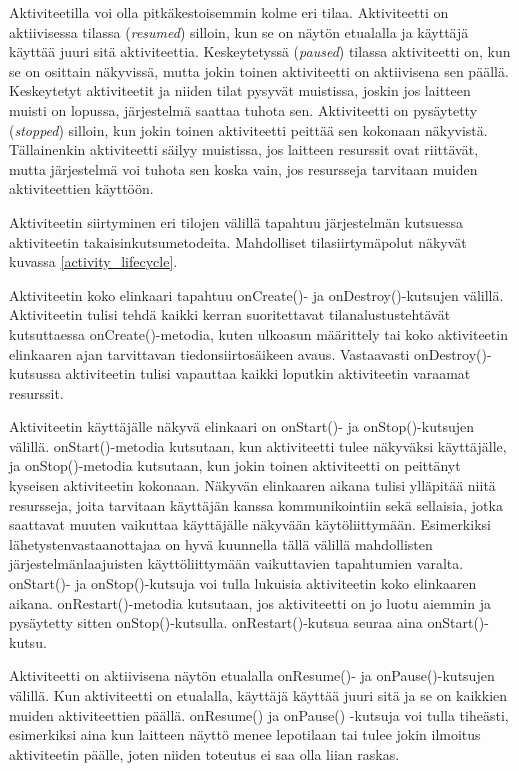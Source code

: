Aktiviteetilla voi olla pitkäkestoisemmin kolme eri tilaa. Aktiviteetti on aktiivisessa tilassa (\emph{resumed}) silloin, kun se on näytön etualalla ja käyttäjä käyttää juuri sitä aktiviteettia. Keskeytetyssä (\emph{paused}) tilassa aktiviteetti on, kun se on osittain näkyvissä, mutta jokin toinen aktiviteetti on aktiivisena sen päällä. Keskeytetyt aktiviteetit ja niiden tilat pysyvät muistissa, joskin jos laitteen muisti on lopussa, järjestelmä saattaa tuhota sen. Aktiviteetti on pysäytetty (\emph{stopped}) silloin, kun jokin toinen aktiviteetti peittää sen kokonaan näkyvistä. Tällainenkin aktiviteetti säilyy muistissa, jos laitteen resurssit ovat riittävät, mutta järjestelmä voi tuhota sen koska vain, jos resursseja tarvitaan muiden aktiviteettien käyttöön.

Aktiviteetin siirtyminen eri tilojen välillä tapahtuu järjestelmän kutsuessa aktiviteetin takaisinkutsumetodeita. Mahdolliset tilasiirtymäpolut näkyvät kuvassa \ref{activity_lifecycle}. 

Aktiviteetin koko elinkaari tapahtuu onCreate()- ja onDestroy()-kutsujen välillä. Aktiviteetin tulisi tehdä kaikki kerran suoritettavat tilanalustustehtävät kutsuttaessa onCreate()-metodia, kuten ulkoasun määrittely tai koko aktiviteetin elinkaaren ajan tarvittavan tiedonsiirtosäikeen avaus. Vastaavasti onDestroy()-kutsussa aktiviteetin tulisi vapauttaa kaikki loputkin aktiviteetin varaamat resurssit.

Aktiviteetin käyttäjälle näkyvä elinkaari on onStart()- ja onStop()-kutsujen välillä. onStart()-metodia kutsutaan, kun aktiviteetti tulee näkyväksi käyttäjälle, ja onStop()-metodia kutsutaan, kun jokin toinen aktiviteetti on peittänyt kyseisen aktiviteetin kokonaan. Näkyvän elinkaaren aikana tulisi ylläpitää niitä resursseja, joita tarvitaan käyttäjän kanssa kommunikointiin sekä sellaisia, jotka saattavat muuten vaikuttaa käyttäjälle näkyvään käytöliittymään. Esimerkiksi lähetystenvastaanottajaa on hyvä kuunnella tällä välillä mahdollisten järjestelmänlaajuisten käyttöliittymään vaikuttavien tapahtumien varalta. onStart()- ja onStop()-kutsuja voi tulla lukuisia aktiviteetin koko elinkaaren aikana. onRestart()-metodia kutsutaan, jos aktiviteetti on jo luotu aiemmin ja pysäytetty sitten onStop()-kutsulla. onRestart()-kutsua seuraa aina onStart()-kutsu.

Aktiviteetti on aktiivisena näytön etualalla onResume()- ja onPause()-kutsujen välillä. Kun aktiviteetti on etualalla, käyttäjä käyttää juuri sitä ja se on kaikkien muiden aktiviteettien päällä. onResume() ja onPause() -kutsuja voi tulla tiheästi, esimerkiksi aina kun laitteen näyttö menee lepotilaan tai tulee jokin ilmoitus aktiviteetin päälle, joten niiden toteutus ei saa olla liian raskas.

